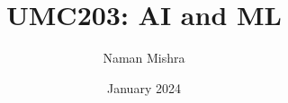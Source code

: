\documentclass[12pt]{report}
\title{UMC203: AI and ML}
\author{Naman Mishra}
\date{January 2024}
\begin{document}
\maketitle
\tableofcontents
\newpage
\listoflecture
    
    
    
    
    
    
    
    
    
    
    
    
    
    
    
    
    
    
    
    
\end{document}
